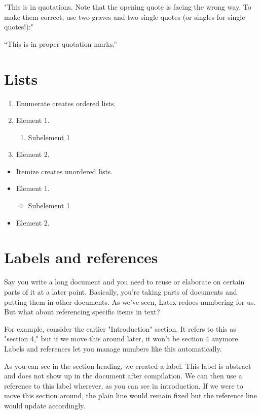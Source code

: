 \documentclass{article}
\begin{document}
"This is in quotations. Note that the opening quote is facing the wrong way. To
make them correct, use two graves and two single quotes (or singles for single
quotes!):"

``This is in proper quotation marks.''

\section{Lists} 

\begin{enumerate}
	\item Enumerate creates ordered lists.
	\item Element 1.
		\begin{enumerate}
			\item Subelement 1
		\end{enumerate}
	\item Element 2.
\end{enumerate}

\begin{itemize}
	\item Itemize creates unordered lists.
	\item Element 1.
		\begin{itemize}
			\item Subelement 1
		\end{itemize}
	\item Element 2.
\end{itemize}

\section{Labels and references\label{labref}}

Say you write a long document and you need to reuse or elaborate on certain
parts of it at a later point. Basically, you're taking parts of documents and
putting them in other documents. As we've seen, Latex redoes numbering for us.
But what about referencing specific items in text?

For example, consider the earlier "Introduction" section. It refers to this as
"section 4," but if we move this around later, it won't be section 4 anymore.
Labels and references let you manage numbers like this automatically.

As you can see in the section heading, we created a label. This label is
abstract and does not show up in the document after compilation. We can then
use a reference to this label wherever, as you can see in introduction. If we
were to move this section around, the plain line would remain fixed but the
reference line would update accordingly.
\end{document}
